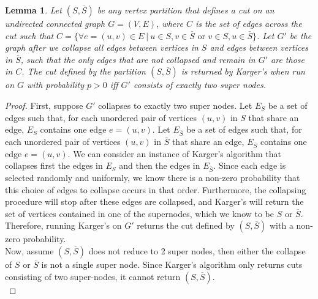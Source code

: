 \documentclass[psamsfonts, 10pt]{amsart}
\newtheorem{lem}[thm]{Lemma}
\theoremstyle{definition}
\theoremstyle{remark}
\numberwithin{equation}{section}
\newcommand{\tor}{\text{ or } }
\begin{document}
\begin{lem} Let $(S, \overline{S})$ be any vertex partition that defines a cut on an undirected connected graph $G = (V, E)$, where $C$ is the set of edges across the cut such that $C = \{ \forall e = (u,v) \in E \  \lvert \ u \in S, v \in \overline{S} \tor v \in S, u \in \overline{S} \}$. Let $G'$ be the graph after we collapse all edges between vertices in $S$ and edges between vertices in $\overline{S}$, such that the only edges that are not collapsed and remain in $G'$ are those in $C$. The cut defined by the partition $(S, \overline{S})$ is returned by Karger's when run on $G$ with probability $p > 0$ iff $G'$ consists of exactly two super nodes. 
\end{lem}
\begin{proof}
First, suppose $G'$ collapses to exactly two super nodes. Let $E_S$ be a set of edges such that, for each unordered pair of vertices $(u,v)$ in $S$ that share an edge, $E_S$ contains one edge $e=(u,v)$. Let $E_{\overline{S}}$ be a set of edges such that, for each unordered pair of vertices $(u,v)$ in $\overline{S}$ that share an edge, $E_{\overline{S}}$ contains one edge $e=(u,v)$. We can consider an instance of Karger's algorithm that collapses first the edges in $E_S$ and then the edges in $E_{\overline{S}}$. Since each edge is selected randomly and uniformly, we know there is a non-zero probability that this choice of edges to collapse occurs in that order. Furthermore, the collapsing procedure will stop after these edges are collapsed, and Karger's will return the set of vertices contained in one of the supernodes, which we know to be $S$ or $\overline{S}$. Therefore, running Karger's on $G'$ returns the cut defined by $(S, \overline{S})$ with a non-zero probability.\\

Now, assume $(S,\overline{S})$ does not reduce to 2 super nodes, then either the collapse of $S$ or $\overline{S}$ is not a single super node. Since Karger's algorithm only returns cuts consisting of two super-nodes, it cannot return $(S,\overline{S})$.\\
\end{proof}
\end{document}
